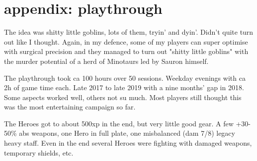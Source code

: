 \newpage
\section*{appendix: playthrough}

\begin{readoutloud}
The idea was shitty little goblins, lots of them, tryin' and dyin'. Didn't quite turn out like I thought. Again, in my defence, some of my players can super optimise with surgical precision and they managed to turn out "shitty little goblins" with the murder potential of a herd of Minotaurs led by Sauron himself.
\end{readoutloud}

\noindent The playthrough took ca 100 hours over 50 sessions. Weekday evenings with ca 2h of game time each. Late 2017 to late 2019 with a nine months' gap in 2018. Some aspects worked well, others not su much. Most players still thought this was the most entertaining campaign so far.

The Heroes got to about 500xp in the end, but very little good gear. A few +30-50\% abs weapons, one Hero in full plate, one misbalanced (dam 7/8) legacy heavy staff. Even in the end several Heroes were fighting with damaged weapons, temporary shields, etc.

